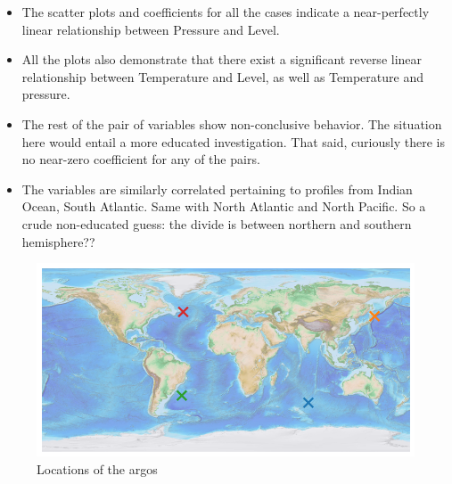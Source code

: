 \documentclass[12pt]{article}
\begin{document}
    \begin{itemize}
        \item The scatter plots and coefficients for all the cases 
        indicate a near-perfectly
        linear relationship between Pressure and Level. 
        \item All the plots also demonstrate that there exist a 
        significant reverse linear relationship between Temperature 
        and Level,
        as well as Temperature and pressure.
        \item The rest of the pair of variables show non-conclusive 
        behavior. The situation here would entail a more educated 
        investigation. That said, curiously there is no near-zero 
        coefficient for any of the pairs.
        \item The variables are similarly correlated pertaining to 
        profiles from Indian Ocean, South Atlantic. Same with North Atlantic
        and North Pacific. So a crude non-educated guess: the divide 
        is between northern and southern hemisphere??
    \end{itemize}

    \begin{figure}[H]
        \centering
        \includegraphics[scale=0.7]{map_of_locations.png}
        \caption{Locations of the argos}
        \label{map}
        \end{figure}
    
\end{document}
